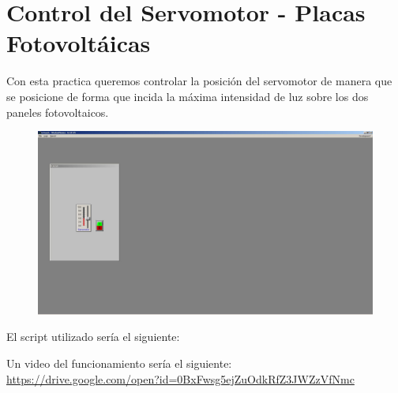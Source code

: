 \documentclass[10pt,a4paper,spanish]{report}
\begin{document}
\chapter{Control del Servomotor - Placas Fotovoltáicas}

\noindent
Con esta practica queremos controlar la posición del servomotor de manera que se posicione de forma que incida la máxima intensidad de luz sobre los dos paneles fotovoltaicos.

\begin{figure}[!hbp]
	\centering  \includegraphics[width=1\textwidth]{Imagenes/p5.JPG}
\end{figure}

\noindent
El script utilizado sería el siguiente:


\noindent
Un video del funcionamiento sería el siguiente:\\

\noindent
\href{https://drive.google.com/open?id=0BxFwsg5ejZuOdkRfZ3JWZzVfNmc}{https://drive.google.com/open?id=0BxFwsg5ejZuOdkRfZ3JWZzVfNmc}
\end{document}
